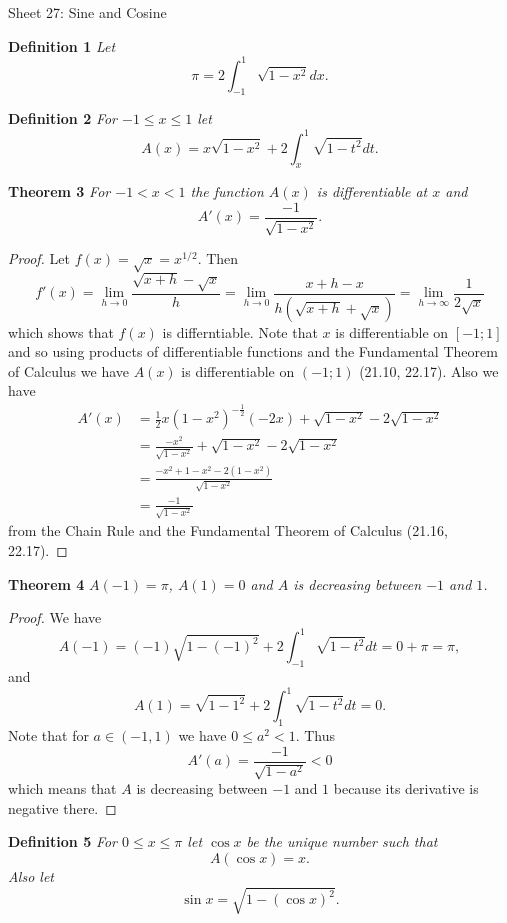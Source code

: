 \documentclass{article}
\begin{document}
\begin{flushleft}

\Large

Sheet 27: Sine and Cosine\newline

\normalsize

\textbf{Definition 1}
\textsl{Let
\[
\pi = 2 \int_{-1}^1 \sqrt{1-x^2} dx.
\]}

\textbf{Definition 2}
\textsl{For $-1 \leq x \leq 1$ let
\[
A(x) = x \sqrt{1-x^2} + 2 \int_x^1 \sqrt{1-t^2} dt.
\]}

\textbf{Theorem 3}
\textsl{For $-1 < x < 1$ the function $A(x)$ is differentiable at $x$ and
\[
A'(x) = \frac{-1}{\sqrt{1-x^2}}.
\]}
\begin{proof}
Let $f(x) = \sqrt{x} = x^{1/2}$. Then
\[
f'(x) = \lim_{h \rightarrow 0} \frac{\sqrt{x+h} - \sqrt{x}}{h} = \lim_{h \rightarrow 0} \frac{x+h-x}{h(\sqrt{x+h} + \sqrt{x})} = \lim_{h \rightarrow \infty} \frac{1}{2\sqrt{x}}
\]
which shows that $f(x)$ is differntiable. Note that $x$ is differentiable on $[-1;1]$ and so using products of differentiable functions and the Fundamental Theorem of Calculus we have $A(x)$ is differentiable on $(-1;1)$ (21.10, 22.17). Also we have
\begin{align*}
A'(x) &= \frac{1}{2} x \left ( 1-x^2 \right )^{-\frac{1}{2}} (-2x) + \sqrt{1-x^2} - 2 \sqrt{1-x^2} \\
	 &= \frac{-x^2}{\sqrt{1-x^2}} + \sqrt{1-x^2} - 2 \sqrt{1-x^2} \\
	 &= \frac{-x^2 + 1 - x^2 - 2 (1-x^2)}{\sqrt{1-x^2}} \\
	 &= \frac{-1}{\sqrt{1-x^2}}
\end{align*}
from the Chain Rule and the Fundamental Theorem of Calculus (21.16, 22.17).
\end{proof}

\textbf{Theorem 4}
\textsl{$A(-1) = \pi$, $A(1) = 0$ and $A$ is decreasing between $-1$ and $1$.}
\begin{proof}
We have
\[
A(-1) = (-1) \sqrt{1 - (-1)^2} + 2 \int_{-1}^1 \sqrt{1 - t^2} dt = 0 + \pi = \pi,
\]
and
\[
A(1) = \sqrt{1 - 1^2} + 2 \int_1^1 \sqrt{1-t^2} dt = 0.
\]
Note that for $a \in (-1,1)$ we have $0 \leq a^2 < 1$. Thus
\[
A'(a) = \frac{-1}{\sqrt{1-a^2}} < 0
\]
which means that $A$ is decreasing between $-1$ and $1$ because its derivative is negative there.
\end{proof}

\textbf{Definition 5}
\textsl{For $0 \leq x \leq \pi$ let $\cos x$ be the unique number such that
\[
A(\cos x) = x.
\]
Also let
\[
\sin x = \sqrt{1 - (\cos x)^2}.
\]}


\end{flushleft}
\end{document}
